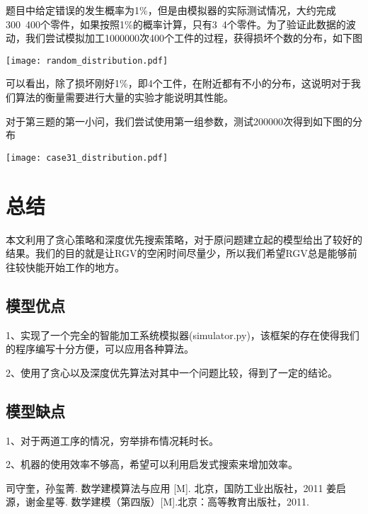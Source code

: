 \documentclass{cumcmthesis}
\begin{document}
题目中给定错误的发生概率为1\%，但是由模拟器的实际测试情况，大约完成300~400个零件，如果按照1\%的概率计算，只有3~4个零件。为了验证此数据的波动，我们尝试模拟加工1000000次400个工件的过程，获得损坏个数的分布，如下图

\begin{center}
	\texttt{[image: random\_distribution.pdf]}
\end{center}

可以看出，除了损坏刚好1\%，即4个工件，在附近都有不小的分布，这说明对于我们算法的衡量需要进行大量的实验才能说明其性能。

对于第三题的第一小问，我们尝试使用第一组参数，测试200000次得到如下图的分布

\begin{center}
	\texttt{[image: case31\_distribution.pdf]}
\end{center}

\section{总结}

本文利用了贪心策略和深度优先搜索策略，对于原问题建立起的模型给出了较好的结果。我们的目的就是让RGV的空闲时间尽量少，所以我们希望RGV总是能够前往较快能开始工作的地方。

\subsection{模型优点}

1、实现了一个完全的智能加工系统模拟器(simulator.py)，该框架的存在使得我们的程序编写十分方便，可以应用各种算法。

2、使用了贪心以及深度优先算法对其中一个问题比较，得到了一定的结论。

\subsection{模型缺点}

1、对于两道工序的情况，穷举排布情况耗时长。

2、机器的使用效率不够高，希望可以利用启发式搜索来增加效率。

\begin{thebibliography}{9}%
 司守奎，孙玺菁. 数学建模算法与应用 [M]. 北京，国防工业出版社，2011
 姜启源，谢金星等. 数学建模（第四版）[M].北京：高等教育出版社，2011.
\end{thebibliography}
\end{document}
